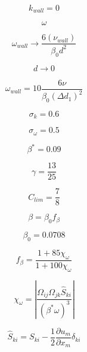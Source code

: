 \begin{equation}
k_{wall} = 0
\end{equation}

\begin{equation}
\omega
\end{equation}

\begin{equation}
\omega_{wall} \rightarrow \frac{6 (\nu_{wall})}{\beta_0 d^2}
\end{equation}

\begin{equation}
d \rightarrow 0
\end{equation}

\begin{equation}
\omega_{wall} = 10 \frac{6 \nu}{\beta_0 (\Delta d_1)^2}
\end{equation}

\begin{equation}
\sigma_k = 0.6
\end{equation}

\begin{equation}
\sigma_{\omega} = 0.5
\end{equation}

\begin{equation}
\beta^* = 0.09
\end{equation}

\begin{equation}
\gamma = \frac{13}{25}
\end{equation}

\begin{equation}
C_{lim} = \frac{7}{8}
\end{equation}

\begin{equation}
\beta = \beta_0 f_{\beta}
\end{equation}

\begin{equation}
\beta_0 = 0.0708
\end{equation}

\begin{equation}
f_{\beta} = \frac{1 + 85 \chi_{\omega}}{1 + 100 \chi_{\omega}}
\end{equation}

\begin{equation}
\chi_{\omega} = \left| \frac{\Omega_{ij} \Omega_{jk} \hat S_{ki}}
  {(\beta^* \omega)^3} \right|
\end{equation}

\begin{equation}
\hat S_{ki} = S_{ki} - \frac{1}{2} \frac{\partial u_m}{\partial x_m} \delta_{ki}
\end{equation}

